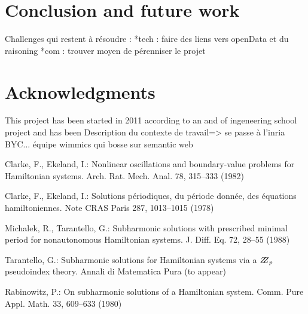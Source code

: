 \documentclass{llncs}
\begin{document}
\section{Conclusion and future work}
%
Challenges qui restent à résoudre :
	*tech : faire des liens vers openData et du raisoning
	*com : trouver moyen de pérenniser le projet
%

\section{Acknowledgments}
%
This project has been started in 2011 according to an and of ingeneering school project and has been 
Description du contexte de travail=> se passe à l'inria BYC... équipe wimmics qui bosse sur semantic web

%





%
%
\begin{thebibliography}{5}
%
Clarke, F., Ekeland, I.:
Nonlinear oscillations and
boundary-value problems for Hamiltonian systems.
Arch. Rat. Mech. Anal. 78, 315--333 (1982)

Clarke, F., Ekeland, I.:
Solutions p\'{e}riodiques, du
p\'{e}riode donn\'{e}e, des \'{e}quations hamiltoniennes.
Note CRAS Paris 287, 1013--1015 (1978)

Michalek, R., Tarantello, G.:
Subharmonic solutions with prescribed minimal
period for nonautonomous Hamiltonian systems.
J. Diff. Eq. 72, 28--55 (1988)

Tarantello, G.:
Subharmonic solutions for Hamiltonian
systems via a $\bbbz_{p}$ pseudoindex theory.
Annali di Matematica Pura (to appear)

Rabinowitz, P.:
On subharmonic solutions of a Hamiltonian system.
Comm. Pure Appl. Math. 33, 609--633 (1980)

\end{thebibliography}

\clearpage
\end{document}

